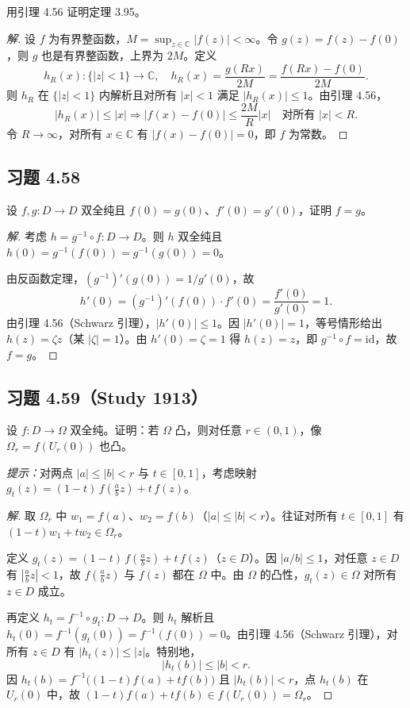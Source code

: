 \documentclass[11pt,a4paper]{article}
\newcommand{\C}{\mathbb{C}}
\theoremstyle{definition}
\newenvironment{solution}{\begin{proof}[解]}{\end{proof}}
\begin{document}
用引理 4.56 证明定理 3.95。

\begin{solution}
  设 $f$ 为有界整函数，$M = \sup_{z \in \C} |f(z)| < \infty$。令 $g(z) = f(z) - f(0)$，则 $g$ 也是有界整函数，上界为 $2M$。定义
  \[
    h_R(x): \{|z| < 1\} \to \C, \quad h_R(x) = \frac{g(Rx)}{2M} =
    \frac{f(Rx) - f(0)}{2M}.
  \]
  则 $h_R$ 在 $\{|z| < 1\}$ 内解析且对所有 $|x| < 1$ 满足 $|h_R(x)| \le 1$。由引理 4.56，
  \[
    |h_R(x)| \le |x| \Rightarrow |f(x) - f(0)| \le \frac{2M}{R} |x|
    \quad \text{对所有 } |x| < R.
  \]
  令 $R \to \infty$，对所有 $x \in \C$ 有 $|f(x) - f(0)| = 0$，即 $f$ 为常数。
\end{solution}

\subsection{习题 4.58}

设 $f, g : D \to D$ 双全纯且 $f(0) = g(0)$、$f'(0) = g'(0)$，证明 $f = g$。

\begin{solution}
  考虑 $h = g^{-1} \circ f : D \to D$。则 $h$ 双全纯且 $h(0) = g^{-1}(f(0)) = g^{-1}(g(0)) = 0$。

  由反函数定理，$(g^{-1})'(g(0)) = 1/g'(0)$，故
  \[
    h'(0) = (g^{-1})'(f(0)) \cdot f'(0)
    = \frac{f'(0)}{g'(0)} = 1.
  \]
  由引理 4.56（Schwarz 引理），$|h'(0)| \le 1$。因 $|h'(0)| = 1$，等号情形给出 $h(z) = \zeta z$（某 $|\zeta| = 1$）。由 $h'(0) = \zeta = 1$ 得 $h(z) = z$，即 $g^{-1} \circ f = \mathrm{id}$，故 $f = g$。
\end{solution}

\subsection{习题 4.59（Study 1913）}

设 $f : D \to \Omega$ 双全纯。证明：若 $\Omega$ 凸，则对任意 $r \in (0, 1)$，像 $\Omega_r = f(U_r(0))$ 也凸。

\textit{提示：}对两点 $|a| \le |b| < r$ 与 $t \in [0, 1]$，考虑映射 $g_t(z) = (1-t)\,f\!\left(\frac{a}{b}z\right) + t\,f(z)$。

\begin{solution}
  取 $\Omega_r$ 中 $w_1 = f(a)$、$w_2 = f(b)$（$|a| \le |b| < r$）。往证对所有 $t \in [0,1]$ 有 $(1-t)w_1 + tw_2 \in \Omega_r$。

  定义 $g_t(z) = (1-t)\,f\!\left(\tfrac{a}{b}z\right) + t\,f(z)$（$z \in D$）。因 $|a/b| \le 1$，对任意 $z \in D$ 有 $|\tfrac{a}{b}z| < 1$，故 $f(\tfrac{a}{b}z)$ 与 $f(z)$ 都在 $\Omega$ 中。由 $\Omega$ 的凸性，$g_t(z) \in \Omega$ 对所有 $z \in D$ 成立。

  再定义 $h_t = f^{-1} \circ g_t : D \to D$。则 $h_t$ 解析且 $h_t(0) = f^{-1}(g_t(0)) = f^{-1}(f(0)) = 0$。由引理 4.56（Schwarz 引理），对所有 $z \in D$ 有 $|h_t(z)| \le |z|$。特别地，
  \[
    |h_t(b)| \le |b| < r.
  \]
  因 $h_t(b) = f^{-1}\!\bigl((1-t)f(a) + tf(b)\bigr)$ 且 $|h_t(b)| < r$，点 $h_t(b)$ 在 $U_r(0)$ 中，故 $(1-t)f(a) + tf(b) \in f(U_r(0)) = \Omega_r$。
\end{solution}
\end{document}
